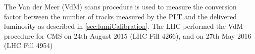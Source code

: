The Van der Meer (VdM) scans procedure \cite{vanderMeer:296752} is used to measure the conversion factor between the number of tracks measured by the PLT and the delivered luminosity as described in \ref{sec:lumiCalibration}. The LHC performed the VdM procedure for CMS on 24th August 2015 (LHC Fill 4266), and on 27th May 2016 (LHC Fill 4954)











